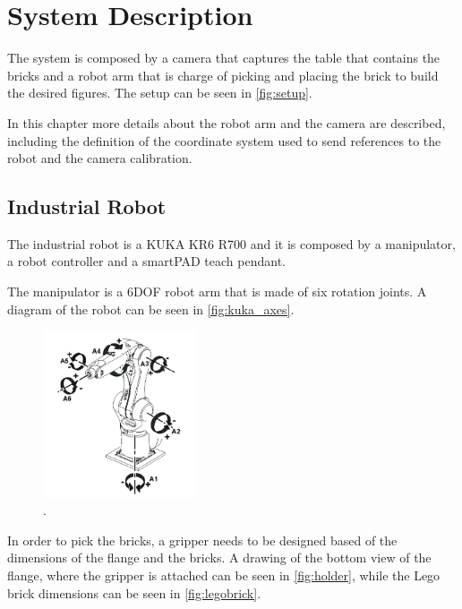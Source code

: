 \chapter{System Description}\label{chap:systemDescription}
The system is composed by a camera that captures the table that contains the bricks and a robot arm that is charge of picking and placing the brick to build the desired figures. The setup can be seen in \autoref{fig:setup}.


In this chapter more details about the robot arm and the camera are described, including the definition of the coordinate system used to send references to the robot and the camera calibration. 

\section{Industrial Robot}
The industrial robot is a KUKA KR6 R700 and it is composed by a manipulator, a robot controller and a smartPAD teach pendant. 

The manipulator is a 6DOF robot arm that is made of six rotation joints. A diagram of the robot can be seen in \autoref{fig:kuka_axes}.
\begin{figure}[H]
    \includegraphics[width=0.4\textwidth]{figures/kuka_axes.png}
    \caption{.\cite{kuka} }
    \label{fig:kuka_axes}
\end{figure}

In order to pick the bricks, a gripper needs to be designed based of the dimensions of the flange and the bricks. A drawing of the bottom view of the flange, where the gripper is attached can be seen in \autoref{fig:holder}, while the Lego brick dimensions can be seen in \autoref{fig:legobrick}.

